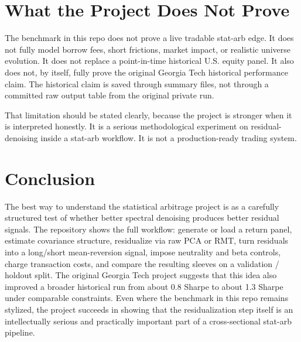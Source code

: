 \documentclass[11pt]{article}
\begin{document}
\section*{What the Project Does Not Prove}

The benchmark in this repo does not prove a live tradable stat-arb edge. It does not
fully model borrow fees, short frictions, market impact, or realistic universe
evolution. It does not replace a point-in-time historical U.S. equity panel. It
also does not, by itself, fully prove the original Georgia Tech historical
performance claim. The historical claim is saved through summary files,
not through a committed raw output table from the original private run.

That limitation should be stated clearly, because the project is stronger when
it is interpreted honestly. It is a serious methodological experiment on
residual-denoising inside a stat-arb workflow. It is not a production-ready
trading system.

\section*{Conclusion}

The best way to understand the statistical arbitrage project is as a carefully
structured test of whether better spectral denoising produces better residual
signals. The repository shows the full workflow: generate or load a
return panel, estimate covariance structure, residualize via raw PCA or RMT,
turn residuals into a long/short mean-reversion signal, impose neutrality and
beta controls, charge transaction costs, and compare the resulting sleeves on a
validation / holdout split. The original Georgia Tech project suggests that this
idea also improved a broader historical run from about 0.8 Sharpe to about 1.3
Sharpe under comparable constraints. Even where the benchmark in this repo remains
stylized, the project succeeds in showing that the residualization step itself
is an intellectually serious and practically important part of a cross-sectional
stat-arb pipeline.
\end{document}
